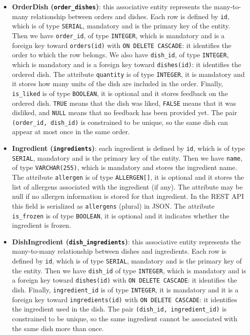 \begin{itemize}
    \item \textbf{OrderDish (\texttt{order\_dishes})}: this associative entity represents the many-to-many relationship between orders and dishes. Each row is defined by \texttt{id}, which is of type \texttt{SERIAL}, mandatory and is the primary key of the entity. Then we have \texttt{order\_id}, of type \texttt{INTEGER}, which is mandatory and is a foreign key toward \texttt{orders(id)} with \texttt{ON DELETE CASCADE}: it identifies the order to which the row belongs. We also have \texttt{dish\_id}, of type \texttt{INTEGER}, which is mandatory and is a foreign key toward \texttt{dishes(id)}: it identifies the ordered dish. The attribute \texttt{quantity} is of type \texttt{INTEGER}, it is mandatory and it stores how many units of the dish are included in the order. Finally, \texttt{is\_liked} is of type \texttt{BOOLEAN}, it is optional and it stores feedback on the ordered dish. \texttt{TRUE} means that the dish was liked, \texttt{FALSE} means that it was disliked, and \texttt{NULL} means that no feedback has been provided yet. The pair \texttt{(order\_id, dish\_id)} is constrained to be unique, so the same dish can appear at most once in the same order.

    \item \textbf{Ingredient (\texttt{ingredients})}: each ingredient is defined by \texttt{id}, which is of type \texttt{SERIAL}, mandatory and is the primary key of the entity. Then we have \texttt{name}, of type \texttt{VARCHAR(255)}, which is mandatory and stores the ingredient name. The attribute \texttt{allergen} is of type \texttt{ALLERGEN[]}, it is optional and it stores the list of allergens associated with the ingredient (if any). The attribute may be null if no allergen information is stored for that ingredient. In the REST API this field is serialized as \texttt{allergens} (plural) in JSON. The attribute \texttt{is\_frozen} is of type \texttt{BOOLEAN}, it is optional and it indicates whether the ingredient is frozen.

    \item \textbf{DishIngredient (\texttt{dish\_ingredients})}: this associative entity represents the many-to-many relationship between dishes and ingredients. Each row is defined by \texttt{id}, which is of type \texttt{SERIAL}, mandatory and is the primary key of the entity. Then we have \texttt{dish\_id} of type \texttt{INTEGER}, which is mandatory and is a foreign key toward \texttt{dishes(id)} with \texttt{ON DELETE CASCADE}: it identifies the dish. Finally, \texttt{ingredient\_id} is of type \texttt{INTEGER}, it is mandatory and it is a foreign key toward \texttt{ingredients(id)} with \texttt{ON DELETE CASCADE}: it identifies the ingredient used in the dish. The pair \texttt{(dish\_id, ingredient\_id)} is constrained to be unique, so the same ingredient cannot be associated with the same dish more than once.
\end{itemize}


